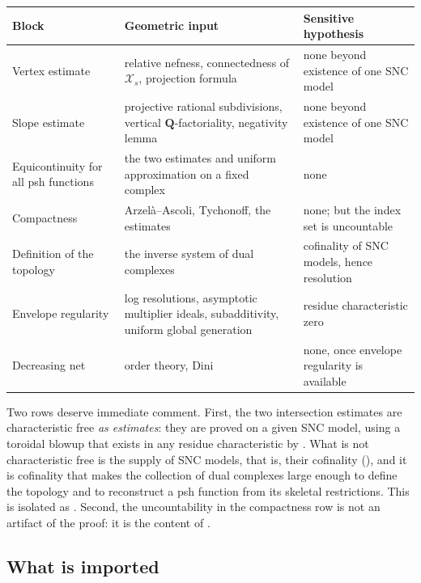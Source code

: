 \begin{center}
\small
\begin{tabular}{p{}p{}p{}}
\toprule
Block & Geometric input & Sensitive hypothesis\\
\midrule
Vertex estimate
 & relative nefness, connectedness of \(\mathcal X_s\),
   projection formula
 & none beyond existence of one SNC model\\
Slope estimate
 & projective rational subdivisions, vertical
   \(\mathbf Q\)-factoriality, negativity lemma
 & none beyond existence of one SNC model\\
Equicontinuity for all psh functions
 & the two estimates and uniform approximation on a fixed complex
 & none\\
Compactness
 & Arzel\`a--Ascoli, Tychonoff, the estimates
 & none; but the index set is uncountable\\
Definition of the topology
 & the inverse system of dual complexes
 & cofinality of SNC models, hence resolution\\
Envelope regularity
 & log resolutions, asymptotic multiplier ideals, subadditivity,
   uniform global generation
 & residue characteristic zero\\
Decreasing net
 & order theory, Dini
 & none, once envelope regularity is available\\
\bottomrule
\end{tabular}
\end{center}

Two rows deserve immediate comment.  First, the two intersection estimates
are characteristic free \emph{as estimates}: they are proved on a given SNC
model, using a toroidal blowup that exists in any residue characteristic by
.  What is not characteristic free is the
supply of SNC models, that is, their cofinality
(), and it is cofinality that
makes the collection of dual complexes large enough to define the topology
and to reconstruct a psh function from its skeletal restrictions.  This is
isolated as .  Second, the
uncountability in the compactness row is not an artifact of the proof: it is
the content of .

\subsection{What is imported}
\label{sec:ch22-imports}

